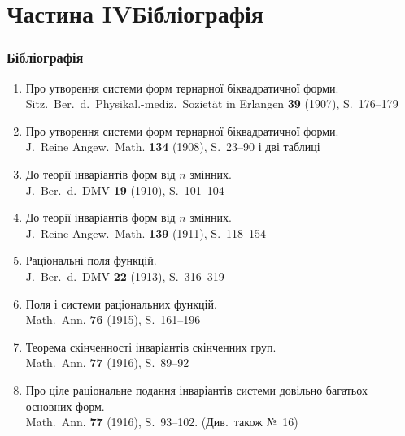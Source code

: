 \documentclass[11pt]{article}
\newcommand{\foreign}[1]{#1}
\begin{document}
\part*{Частина IV\hspace{1em}Бібліографія}

\section*{Бібліографія}

\begin{enumerate}[label={\small\arabic*.},leftmargin=2em,itemsep=0.3em]
\item Про утворення системи форм тернарної біквадратичної форми.\\
\foreign{Sitz.\ Ber.\ d.\ Physikal.-mediz.\ Sozietät in Erlangen} \textbf{39} (1907), S.~176--179

\item Про утворення системи форм тернарної біквадратичної форми.\\
\foreign{J.\ Reine Angew.\ Math.} \textbf{134} (1908), S.~23--90 і дві таблиці

\item До теорії інваріантів форм від $n$ змінних.\\
\foreign{J.\ Ber.\ d.\ DMV} \textbf{19} (1910), S.~101--104

\item До теорії інваріантів форм від $n$ змінних.\\
\foreign{J.\ Reine Angew.\ Math.} \textbf{139} (1911), S.~118--154

\item Раціональні поля функцій.\\
\foreign{J.\ Ber.\ d.\ DMV} \textbf{22} (1913), S.~316--319

\item Поля і системи раціональних функцій.\\
\foreign{Math.\ Ann.} \textbf{76} (1915), S.~161--196

\item Теорема скінченності інваріантів скінченних груп.\\
\foreign{Math.\ Ann.} \textbf{77} (1916), S.~89--92

\item Про ціле раціональне подання інваріантів системи довільно багатьох основних форм.\\
\foreign{Math.\ Ann.} \textbf{77} (1916), S.~93--102. (Див.\ також №~16)


\end{enumerate}
\end{document}
